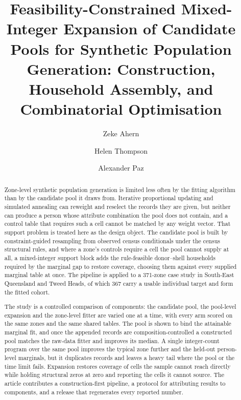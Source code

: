 \documentclass[review]{elsarticle}
\begin{document}

\begin{frontmatter}

\author{Zeke Ahern}

\title{Feasibility-Constrained Mixed-Integer Expansion of Candidate Pools for Synthetic Population Generation: Construction, Household Assembly, and Combinatorial Optimisation}

\author{Helen Thompson }
\author{Alexander Paz}

\fntext[label1]{}
\fntext[label2]{}
\cortext[cor1]{}

\begin{abstract}
Zone-level synthetic population generation is limited less often by the fitting algorithm than by the candidate pool it draws from. Iterative proportional updating and simulated annealing can reweight and reselect the records they are given, but neither can produce a person whose attribute combination the pool does not contain, and a control table that requires such a cell cannot be matched by any weight vector. That support problem is treated here as the design object. The candidate pool is built by constraint-guided resampling from observed census conditionals under the census structural rules, and where a zone's controls require a cell the pool cannot supply at all, a mixed-integer support block adds the rule-feasible donor--shell households required by the marginal gap to restore coverage, choosing them against every supplied marginal table at once. The pipeline is applied to a 371-zone case study in South-East Queensland and Tweed Heads, of which 367 carry a usable individual target and form the fitted cohort.

The study is a controlled comparison of components: the candidate pool, the pool-level expansion and the zone-level fitter are varied one at a time, with every arm scored on the same zones and the same shared tables. The pool is shown to bind the attainable marginal fit, and once the appended records are composition-controlled a constructed pool matches the raw-data fitter and improves its median. A single integer-count program over the same pool improves the typical zone further and the held-out person-level marginals, but it duplicates records and leaves a heavy tail where the pool or the time limit fails. Expansion restores coverage of cells the sample cannot reach directly while holding structural zeros at zero and reporting the cells it cannot source. The article contributes a construction-first pipeline, a protocol for attributing results to components, and a release that regenerates every reported number.
\end{abstract}


\end{frontmatter}
\end{document}
